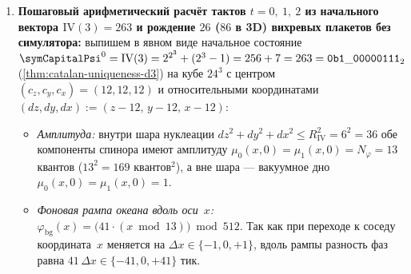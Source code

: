 \begin{corollary}[Единство природы и количества заряда: частное и остаток одного деления на $\phaseRingCount = 512$]
\begin{enumerate}[label=(\roman*)]
  разложение~\eqref{eq:quotient-remainder-512} снимает классический парадокс корпускулярно-волнового дуализма и «коллапса волновой функции» без привлечения вероятностных постулатов. Пока на всех четырёх рёбрах квадрата разность фаз остаётся внутри главного интервала ($|(d_0\varphi)_{xy}|\le 256$),
  все четыре неполных частных равны нулю ($k_e=0 \implies n_f = -\sum_{e\in\partial f} k_e = 0$), и возмущение распространяется по $12$~поворотным рёбрам кубооктаэдра исключительно как \textbf{остаток} $A_{xy}\in(-256,+256]$ (безысточниковая волна, свободно делящаяся между путями и интерферирующая на щелях со сферически изотропным фронтом второго порядка $\sum_{j=1}^{12}(\mathbf{k}\cdot e_j)^2 = 8\,|\mathbf{k}|^2$). Как только в локальном узле концентрации фазы разность на ребре квадрата
  перешагивает полуоборот Паули $\Phi_{\mathrm{Pauli}}=256$ (или порог срабатывания ворот $\Delta\varphi_{\mathrm{disc}}=41$), целочисленное деление~\eqref{eq:quotient-remainder-512} перебрасывает
  целую единицу из остатка $A_{xy}$ в \textbf{неполное частное} ($k_{xy}=\pm 1$, $A_{xy} = (d_0\varphi)_{xy} \mp 512$), и сумма четырёх остатков по контуру квадрата становится равной $(d_1 A)_f = \pm 512$, рождая или поглощая неделимый целочисленный вихревой квант $n_f = (d_1 A)_f/512 \in \{-1,0,+1\}$ (\textbf{корпускулу}). Поскольку неполное частное $k_{xy}\in\mathbb{Z}$ и индекс намотки $n_f\in\mathbb{Z}$ по определению целочисленного деления не могут принимать дробных значений, волна (остаток~$A_{xy}$) распространяется и интерферирует по всем $12$~рёбрам кубооктаэдра, но рождаться и регистрироваться детектором может только неделимое целое частное (корпускула~$n_f$).
\item \textbf{Пошаговый арифметический расчёт тактов $t=0,\ 1,\ 2$ из начального вектора $\mathrm{IV}(3)=263$ и рождение $26$ ($86$ в 3D) вихревых плакетов без симулятора:}
  выпишем в явном виде начальное состояние $\symCapitalPsi^0 = \mathrm{IV}(3) = 2^{2^3} + (2^3-1) = 256 + 7 = 263 = \mathtt{0b1\_00000111}_2$ (\cref{thm:catalan-uniqueness-d3}) на кубе $24^3$ с центром $(c_z,c_y,c_x)=(12,12,12)$ и относительными координатами $(dz,dy,dx) := (z-12,\,y-12,\,x-12)$:
  \begin{itemize}[nosep,leftmargin=*]
  \item \emph{Амплитуда:} внутри шара нуклеации $dz^2+dy^2+dx^2 \le R_{\mathrm{IV}}^2 = 6^2 = 36$ обе компоненты спинора имеют амплитуду $\mu_0(x,0) = \mu_1(x,0) = N_\varphi = 13$ квантов ($13^2 = 169$ $\mathrm{квантов}^2$), а вне шара --- вакуумное дно $\mu_0(x,0)=\mu_1(x,0)=1$.
  \item \emph{Фоновая рампа океана вдоль оси~$x$:} $\varphi_{\mathrm{bg}}(x) = \bigl(41\cdot(x\bmod 13)\bigr)\bmod 512$. Так как при переходе к соседу координата~$x$ меняется на $\Delta x\in\{-1,0,+1\}$, вдоль рампы разность фаз равна $41\,\Delta x \in \{-41,0,+41\}$ тик.

\end{itemize}
\end{enumerate}
\end{corollary}
